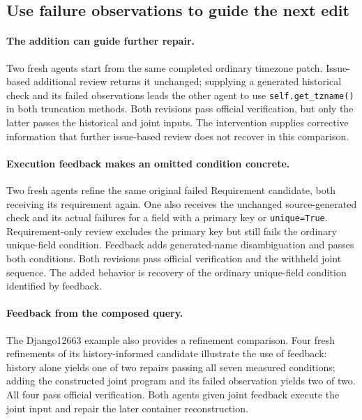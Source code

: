 \subsection{Use failure observations to guide the next edit}
\label{sec:details-feedback}

\paragraph{The addition can guide further repair.}
Two fresh agents start from the same completed ordinary timezone patch.
Issue-based additional review returns it unchanged; supplying a generated historical check and its failed observations leads the other agent to use \texttt{self.get\_tzname()} in both truncation methods.
Both revisions pass official verification, but only the latter passes the historical and joint inputs.
The intervention supplies corrective information that further issue-based review does not recover in this comparison.

\paragraph{Execution feedback makes an omitted condition concrete.}
Two fresh agents refine the same original failed Requirement candidate, both receiving its requirement again.
One also receives the unchanged source-generated check and its actual failures for a field with a primary key or \texttt{unique=True}.
Requirement-only review excludes the primary key but still fails the ordinary unique-field condition.
Feedback adds generated-name disambiguation and passes both conditions.
Both revisions pass official verification and the withheld joint sequence.
The added behavior is recovery of the ordinary unique-field condition identified by feedback.

\paragraph{Feedback from the composed query.}
The Django12663 example also provides a refinement comparison.
Four fresh refinements of its history-informed candidate illustrate the use of feedback:
history alone yields one of two repairs passing all seven measured conditions;
adding the constructed joint program and its failed observation yields two of
two. All four pass official verification. Both agents given joint feedback execute the
joint input and repair the later container reconstruction.
